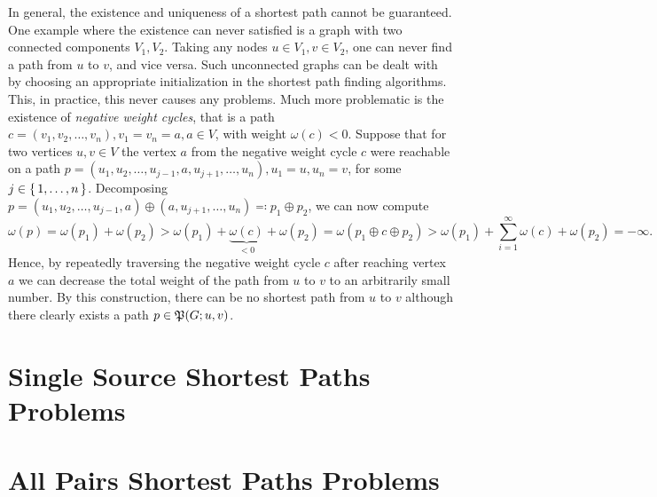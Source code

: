 In general, the existence and uniqueness of a shortest path cannot be guaranteed.
One example where the existence can never satisfied is a graph with two connected components $V_1, V_2$.
Taking any nodes $u \in V_1, v \in V_2$, one can never find a path from $u$ to $v$, and vice versa.
Such unconnected graphs can be dealt with by choosing an appropriate initialization in the shortest path finding algorithms.
This, in practice, this never causes any problems.
Much more problematic is the existence of \emph{negative weight cycles}, that is a path $c = (v_1, v_2, \dots, v_n), v_1 = v_n = a, a \in V$, with weight $\omega(c) < 0$.
Suppose that for two vertices $u, v \in V$ the vertex $a$ from the negative weight cycle $c$ were reachable on a path $p = (u_1, u_2, \dots, u_{j - 1}, a, u_{j + 1}, \dots, u_n), u_1 = u, u_n = v$, for some $j \in \left\{\,1, \dots, n\,\right\}$.
Decomposing $p = (u_1, u_2, \dots, u_{j - 1}, a) \oplus (a, u_{j + 1}, \dots, u_n) \eqqcolon p_1 \oplus p_2$, we can now compute
\[
    \omega(p) = \omega(p_1) + \omega(p_2) > \omega(p_1) + \underbrace{\omega(c)}_{< 0} + \omega(p_2) = \omega(p_1 \oplus c \oplus p_2) > \omega(p_1) + \sum\limits_{i = 1}^\infty \omega(c) + \omega(p_2) = -\infty.
\]
Hence, by repeatedly traversing the negative weight cycle $c$ after reaching vertex $a$ we can decrease the total weight of the path from $u$ to $v$ to an arbitrarily small number.
By this construction, there can be no shortest path from $u$ to $v$ although there clearly exists a path $p \in \mathfrak{P}(G; u, v)$.

\section{Single Source Shortest Paths Problems}


\section{All Pairs Shortest Paths Problems}

